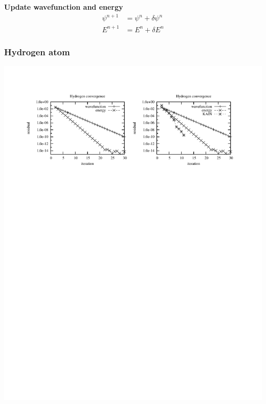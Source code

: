 \begin{frame}
    \vspace{5mm}

    \textbf{Update wavefunction and energy}
    \begin{align}
	\nonumber
        \psi^{n+1}  &= \psi^n + \delta \psi^n\\
	\nonumber
        E^{n+1}     &= E^n + \delta E^n
    \end{align}
\end{frame}

\begin{frame}
    \frametitle{Hydrogen atom}
    \begin{center}
	\includegraphics[scale=1.0, clip, viewport = 300 550 560 740]{figures/h_convergence.pdf}
    \end{center}
\end{frame}

